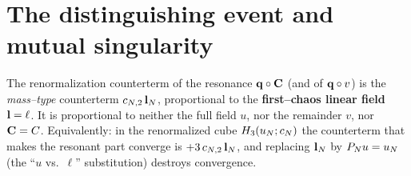 \section*{The distinguishing event and mutual singularity}

\begin{qoneproposition}\label{prop:ctvar}
The renormalization counterterm of the resonance $\mathbf{q}\circ\mathbf{C}$ (and of
$\mathbf{q}\circ v$) is the \emph{mass--type} counterterm $c_{N,2}\,\mathbf{l}_N$,
proportional to the \textbf{first--chaos linear field} $\mathbf{l}=\ell$. It is
proportional to neither the full field $u$, nor the remainder $v$, nor
$\mathbf{C}=C$. Equivalently: in the renormalized cube
$H_3(u_N;c_N)$ the counterterm that makes the resonant part converge is
$+3\,c_{N,2}\,\mathbf{l}_N$, and replacing $\mathbf{l}_N$ by $P_N u=u_N$ (the ``$u$
vs.\ $\ell$'' substitution) destroys convergence.
\end{qoneproposition}


